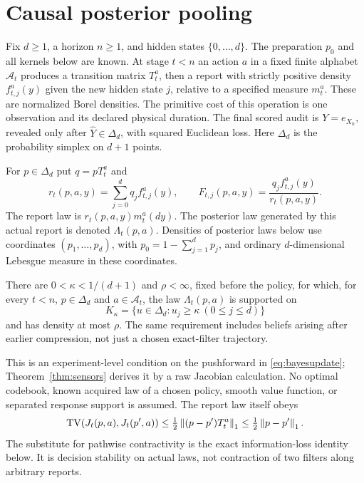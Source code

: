 \section{Causal posterior pooling}\label{sec:pooling}
Fix $d\ge1$, a horizon $n\ge1$, and hidden states $\{0,\ldots,d\}$. The preparation $p_0$ and all kernels below are known. At stage $t<n$ an action $a$ in a fixed finite alphabet $\mathcal A_t$ produces a transition matrix $T_t^a$, then a report with strictly positive density $f_{t,j}^a(y)$ given the new hidden state $j$, relative to a specified measure $m_t^a$. These are normalized Borel densities. The primitive cost of this operation is one observation and its declared physical duration. The final scored audit is $Y=e_{X_n}$, revealed only after $\widehat Y\in\Delta_d$, with squared Euclidean loss. Here $\Delta_d$ is the probability simplex on $d+1$ points.

For $p\in\Delta_d$ put $q=pT_t^a$ and
\begin{equation}\label{eq:bayesupdate}
 r_t(p,a,y)=\sum_{j=0}^d q_j f_{t,j}^a(y),\qquad
 F_{t,j}(p,a,y)=\frac{q_j f_{t,j}^a(y)}{r_t(p,a,y)}.
\end{equation}
The report law is $r_t(p,a,y)m_t^a(dy)$. The posterior law generated by this actual report is denoted $\Lambda_t(p,a)$. Densities of posterior laws below use coordinates $(p_1,\ldots,p_d)$, with $p_0=1-\sum_{j=1}^dp_j$, and ordinary $d$-dimensional Lebesgue measure in these coordinates.

\begin{definition}\label{def:smoothing}
There are $0<\kappa<1/(d+1)$ and $\rho<\infty$, fixed before the policy, for which, for every $t<n$, $p\in\Delta_d$ and $a\in\mathcal A_t$, the law $\Lambda_t(p,a)$ is supported on
\[
 K_\kappa=\{u\in\Delta_d:u_j\ge\kappa\ (0\le j\le d)\}
\]
and has density at most $\rho$. The same requirement includes beliefs arising after earlier compression, not just a chosen exact-filter trajectory.
\end{definition}
This is an experiment-level condition on the pushforward in \eqref{eq:bayesupdate}; Theorem~\ref{thm:sensors} derives it by a raw Jacobian calculation. No optimal codebook, known acquired law of a chosen policy, smooth value function, or separated response support is assumed. The report law itself obeys
\begin{equation}\label{eq:reportcontinuity}
 \operatorname{TV}(J_t(p,a),J_t(p',a))\le\tfrac12\left\lVert(p-p')T_t^a\right\rVert_1
 \le\tfrac12\left\lVert p-p'\right\rVert_1.
\end{equation}
The substitute for pathwise contractivity is the exact information-loss identity below. It is decision stability on actual laws, not contraction of two filters along arbitrary reports.

